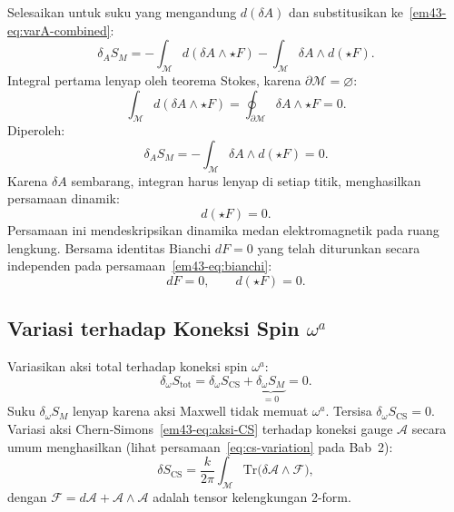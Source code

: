 Selesaikan untuk suku yang mengandung $d(\delta A)$ dan substitusikan ke~\eqref{em43-eq:varA-combined}:
\begin{equation}
    \delta_{A} S_{M}
    = -\int_{\mathcal{M}} d(\delta A \wedge \star F)
    - \int_{\mathcal{M}} \delta A \wedge d(\star F).
\end{equation}
Integral pertama lenyap oleh teorema Stokes, karena $\partial\mathcal{M} = \varnothing$:
\begin{equation}
    \int_{\mathcal{M}} d(\delta A \wedge \star F)
    = \oint_{\partial\mathcal{M}} \delta A \wedge \star F = 0.
\end{equation}
Diperoleh:
\begin{equation}\label{em43-eq:varA-final}
    \delta_{A} S_{M}
    = -\int_{\mathcal{M}} \delta A \wedge d(\star F) = 0.
\end{equation}
Karena $\delta A$ sembarang, integran harus lenyap di setiap titik, menghasilkan persamaan dinamik:
\begin{equation}\label{em43-eq:maxwell-dinamik}
    d(\star F) = 0.
\end{equation}
Persamaan ini mendeskripsikan dinamika medan elektromagnetik pada ruang lengkung. Bersama identitas Bianchi $dF = 0$ yang telah diturunkan secara independen pada persamaan~\eqref{em43-eq:bianchi}:
\begin{equation}\label{em43-eq:eq-maxwell}
    d F = 0, \qquad d(\star F) = 0.
\end{equation}

\subsection{Variasi terhadap Koneksi Spin $\omega^{a}$}
\label{em43-sec:varomega}

Variasikan aksi total terhadap koneksi spin $\omega^{a}$:
\begin{equation}\label{em43-eq:varomega-total}
    \delta_{\omega} S_{\mathrm{tot}}
    = \delta_{\omega} S_{\mathrm{CS}}
    + \underbrace{\delta_{\omega} S_{M}}_{= 0} = 0.
\end{equation}
Suku $\delta_{\omega} S_{M}$ lenyap karena aksi Maxwell tidak memuat $\omega^{a}$. Tersisa $\delta_{\omega} S_{\mathrm{CS}} = 0$.
Variasi aksi Chern-Simons~\eqref{em43-eq:aksi-CS} terhadap koneksi gauge $\mathcal{A}$ secara umum menghasilkan (lihat persamaan~\eqref{eq:cs-variation} pada Bab~2):
\begin{equation}\label{em43-eq:var-CS-umum}
    \delta S_{\mathrm{CS}}
    = \frac{k}{2\pi} \int_{\mathcal{M}}
    \mathrm{Tr}\!\big(\delta\mathcal{A} \wedge \mathcal{F}\big),
\end{equation}
dengan $\mathcal{F} = d\mathcal{A} + \mathcal{A} \wedge \mathcal{A}$ adalah tensor kelengkungan 2-form.

